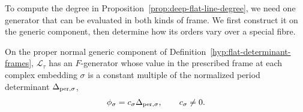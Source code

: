 To compute the degree in Proposition~\ref{prop:deep-flat-line-degree}, we need one generator that can be evaluated in both kinds of frame. We first construct it on the generic component, then determine how its orders vary over a special fibre.

\begin{lemma}\label{lem:flat-generic-generator}
On the proper normal generic component of
Definition~\ref{hyp:flat-determinant-frames}, \(\mathcal L_\tau\) has an \(F\)-generator whose value in the prescribed frame at each complex embedding \(\sigma\) is a constant multiple of the normalized period determinant \(\Delta_{{\rm per},\sigma}\),
\[
 \phi_\sigma=c_\sigma\Delta_{{\rm per},\sigma},\qquad c_\sigma\ne0.
\]

\end{lemma}

